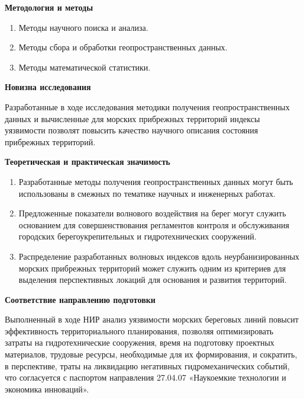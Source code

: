 \vspace{1em}
\textbf{Методология и методы}

\begin{enumerate}
    \item Методы научного поиска и анализа.
    \item Методы сбора и обработки геопространственных данных.
    \item Методы математической статистики.
\end{enumerate}

\vspace{1em}
\textbf{Новизна исследования}

Разработанные в ходе исследования методики получения геопространственных данных и вычисленные для морских прибрежных территорий индексы уязвимости позволят повысить качество научного описания состояния прибрежных территорий.

\vspace{1em}
\textbf{Теоретическая и практическая значимость}

\begin{enumerate}
\item Разработанные методы получения геопространственных данных могут быть использованы в смежных по тематике научных и инженерных работах.
\item Предложенные показатели волнового воздействия на берег могут служить основанием для совершенствования регламентов контроля и обслуживания городских берегоукрепительных и гидротехнических сооружений.
\item Распределение разработанных волновых индексов вдоль неурбанизированных морских прибрежных территорий может служить одним из критериев для выделения перспективных локаций для основания и развития территорий.
\end{enumerate}

\vspace{1em}
\textbf{Соответствие направлению подготовки}

Выполненный в ходе НИР анализ уязвимости морских береговых линий повысит эффективность территориального планирования, позволяя оптимизировать затраты на гидротехнические сооружения, время на подготовку проектных материалов, трудовые ресурсы, необходимые для их формирования, и сократить, в перспективе, траты на ликвидацию негативных гидромеханических событий, что согласуется с паспортом направления 27.04.07 «Наукоемкие технологии и экономика инноваций».
